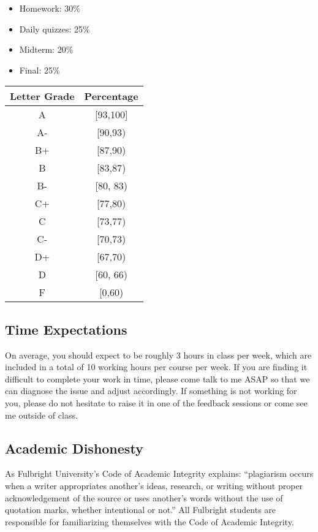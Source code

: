\documentclass[
]{article}
\providecommand{\tightlist}{%
  \setlength{\itemsep}{0pt}\setlength{\parskip}{0pt}}
\begin{document}
\begin{itemize}
\tightlist
\item
  Homework: 30\%
\item
  Daily quizzes: 25\%
\item
  Midterm: 20\%
\item
  Final: 25\%
\end{itemize}

\begin{longtable}[]{@{}cc@{}}
\toprule\noalign{}
\textbf{Letter Grade} & \textbf{Percentage} \\
\midrule\noalign{}
\endhead
\bottomrule\noalign{}
\endlastfoot
A & {[}93,100{]} \\
A- & {[}90,93) \\
B+ & {[}87,90) \\
B & {[}83,87) \\
B- & {[}80, 83) \\
C+ & {[}77,80) \\
C & {[}73,77) \\
C- & {[}70,73) \\
D+ & {[}67,70) \\
D & {[}60, 66) \\
F & {[}0,60) \\
\end{longtable}

\subsection*{Time Expectations}\label{time-expectations}

On average, you should expect to be roughly 3 hours in class per week, which are included in a total of 10 working hours per course per week. If you are finding it difficult to complete your work in time, please come talk to me ASAP so that we can diagnose the issue and adjust accordingly. If something is not working for you, please do not hesitate to raise it in one of the feedback sessions or come see me outside of class.

\subsection*{Academic Dishonesty}\label{academic-dishonesty}

As Fulbright University's Code of Academic Integrity explains: ``plagiarism occurs when a writer appropriates another's ideas, research, or writing without proper acknowledgement of the source or uses another's words without the use of quotation marks, whether intentional or not.'' All Fulbright students are responsible for familiarizing themselves with the Code of Academic Integrity.
\end{document}
